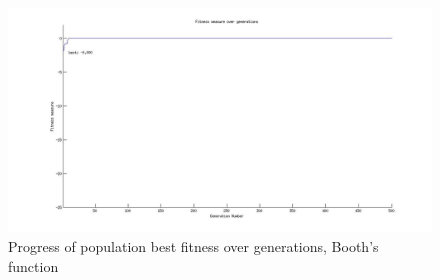 \documentclass[ExampleMasters.tex]{subfiles}
\begin{document}
		\begin{figure}[hb!]
			\centering
			\includegraphics[width=\textwidth]{figures/GeneticAlgorithm/Booth_fitness_vs_generation.jpg}
			\caption{Progress of population best fitness over generations, Booth's function}
			\label{B2F}
		\end{figure}
\end{document}
